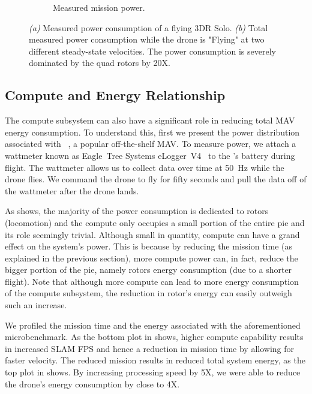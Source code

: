 \begin{figure}[!t]
\begin{subfigure}{.49\columnwidth}
    \caption{Measured mission power.}
    \label{fig:drone-power-time-series}
    \end{subfigure}
\caption{\emph{(a)} Measured power consumption of a flying 3DR Solo. \emph{(b)} Total measured power consumption while the drone is "Flying" at two different steady-state velocities. The power consumption is severely dominated by the quad rotors by 20X.}
\label{SOLO_power_breakdown}
\end{figure}
\subsection{Compute and Energy Relationship}
The compute subsystem can also have a significant role in reducing total MAV energy consumption. To understand this, first we present the power distribution associated with \solo~\cite{solo3DR}, a popular off-the-shelf MAV. To measure power, we attach a wattmeter known as Eagle~Tree Systems eLogger~V4~\cite{eLoggerV4} to the \solo's battery during flight. The wattmeter allows us to collect data over time at 50~Hz while the drone flies. We command the drone to fly for fifty seconds and pull the data off of the wattmeter after the drone lands.


As  shows, the majority of the power consumption is dedicated to rotors (locomotion) and the compute only occupies a small portion of the entire pie and its role seemingly trivial. Although small in quantity, compute can have a grand effect on the system's power. This is because by reducing the mission time (as explained in the previous section), more compute power can, in fact, reduce the bigger portion of the pie, namely rotors energy consumption (due to a shorter flight). Note that although more compute can lead to more energy consumption of the compute subsystem, the reduction in rotor's energy can easily outweigh such an increase.  


We profiled the mission time and the energy associated with the aforementioned microbenchmark. As the bottom plot in  shows, higher compute capability results in increased SLAM FPS and hence a reduction in mission time by allowing for faster velocity. The reduced mission results in reduced total system energy, as the top plot in  shows. By increasing processing speed by 5X, we were able to reduce the drone's energy consumption by close to 4X.

